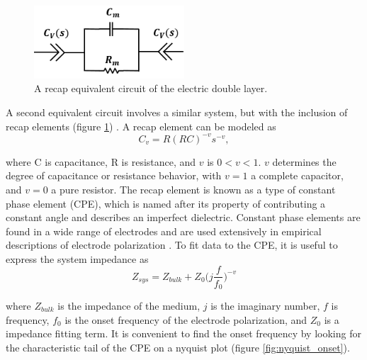 \begin{figure}[h]
    \centering
    \includegraphics[width=0.5\textwidth]{images/edl_recap_equiv.png}
    \caption{A recap equivalent circuit of the electric double layer.}
    \label{fig:edl_recap_equiv}
\end{figure}


\par A second equivalent circuit involves a similar system, but with the inclusion of recap elements (figure \ref{fig:edl_recap_equiv}) \cite{feldman_fractal-polarization_1998-1}. A recap element can be modeled as 
\begin{equation}
    C_v = R(RC)^{-v}s^{-v},
\end{equation}

\noindent where C is capacitance, R is resistance, and $v$ is $0<v<1$. $v$ determines the degree of capacitance or resistance behavior, with $v=1$ a complete capacitor, and $v=0$ a pure resistor. The recap element is known as a type of constant phase element (CPE), which is named after its property of contributing a constant angle and describes an imperfect dielectric. Constant phase elements are found in a wide range of electrodes and are used extensively in empirical descriptions of electrode polarization \cite{ishai_electrode_2013}. To fit data to the CPE, it is useful to express the system impedance as
\begin{equation}
    Z_{sys} = Z_{bulk} + Z_0\bigg(j\frac{f}{f_0}\bigg)^{-v}
\end{equation}

\noindent where $Z_{bulk}$ is the impedance of the medium, $j$ is the imaginary number, $f$ is frequency, $f_0$ is the onset frequency of the electrode polarization, and $Z_0$ is a impedance fitting term. It is convenient to find the onset frequency by looking for the characteristic tail of the CPE on a nyquist plot (figure \ref{fig:nyquist_onset}).

